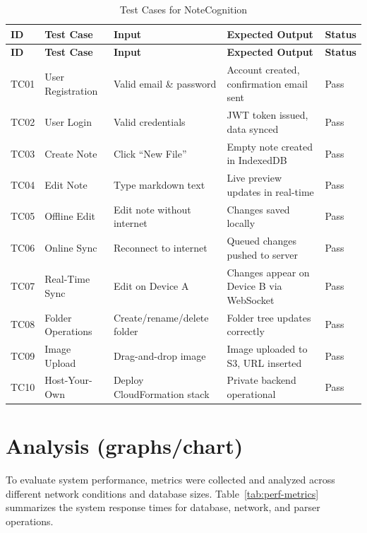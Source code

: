 \documentclass[12pt, a4paper, oneside]{report}
\begin{document}
\begin{longtable}{|p{0.8cm}|p{3cm}|p{4cm}|p{3cm}|p{2cm}|}
\caption{Test Cases for NoteCognition} \label{tab:test-cases} \\
\hline
\textbf{ID} & \textbf{Test Case} & \textbf{Input} & \textbf{Expected Output} & \textbf{Status} \\
\hline
\endfirsthead
\hline
\textbf{ID} & \textbf{Test Case} & \textbf{Input} & \textbf{Expected Output} & \textbf{Status} \\
\hline
\endhead
TC01 & User Registration & Valid email \& password & Account created, confirmation email sent & Pass \\
\hline
TC02 & User Login & Valid credentials & JWT token issued, data synced & Pass \\
\hline
TC03 & Create Note & Click ``New File'' & Empty note created in IndexedDB & Pass \\
\hline
TC04 & Edit Note & Type markdown text & Live preview updates in real-time & Pass \\
\hline
TC05 & Offline Edit & Edit note without internet & Changes saved locally & Pass \\
\hline
TC06 & Online Sync & Reconnect to internet & Queued changes pushed to server & Pass \\
\hline
TC07 & Real-Time Sync & Edit on Device A & Changes appear on Device B via WebSocket & Pass \\
\hline
TC08 & Folder Operations & Create/rename/delete folder & Folder tree updates correctly & Pass \\
\hline
TC09 & Image Upload & Drag-and-drop image & Image uploaded to S3, URL inserted & Pass \\
\hline
TC10 & Host-Your-Own & Deploy CloudFormation stack & Private backend operational & Pass \\
\hline
\end{longtable}

\section{Analysis (graphs/chart)}
To evaluate system performance, metrics were collected and analyzed across different network conditions and database sizes. Table~\ref{tab:perf-metrics} summarizes the system response times for database, network, and parser operations.
\end{document}
